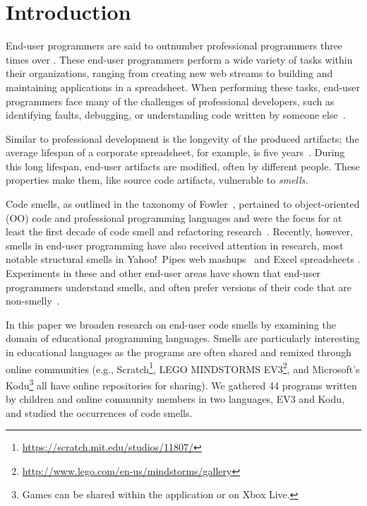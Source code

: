 \documentclass[conference]{IEEEtran}
\newcommand{\ms}{LEGO MINDSTORMS EV3}
\newcommand{\todo}[1]{\textbf{#1}}
\begin{document}
\section{Introduction}
End-user programmers are said to outnumber  professional programmers three times over \cite{Scaf2005}.
These end-user programmers perform a wide variety of tasks within their organizations, ranging from creating new web streams to building and maintaining applications in a spreadsheet. When performing these tasks, end-user programmers face many of the challenges of professional developers, such as identifying faults, debugging, or understanding code written by someone else~\cite{Ko2011}. 

Similar to professional development is the longevity of the produced artifacts; the average lifespan of a corporate spreadsheet, for example, is five years~\cite{Hermans2011}. During this long lifespan, end-user artifacts are modified, often by different people.
These properties make them, like source code artifacts, vulnerable to \emph{smells}. 

Code smells, as outlined in the taxonomy of Fowler~\cite{Fowl1999}, pertained to object-oriented (OO) code and professional programming languages and were the focus for at least the first decade of code smell  and refactoring research~\cite{Mens:2004:SSR:972215.972286}. Recently, however, smells in end-user programming have also received attention in research, most notable structural smells in Yahoo!\ Pipes web mashups~\cite{Stolee2011} and Excel spreadsheets \cite{Hermans2012inter}. Experiments in these and other end-user areas have shown that end-user programmers understand smells, and often prefer versions of their code that are non-smelly~\cite{Hermans2012intra, StoleeTSE2013, chambers2013smell}.


In this paper we broaden research on end-user code smells by examining the domain of educational programming languages. Smells are particularly interesting in educational languages as the programs are often shared and remixed through online communities (e.g., Scratch\footnote{\url{https://scratch.mit.edu/studios/11807/}}, \ms\footnote{\url{http://www.lego.com/en-us/mindstorms/gallery}}, and Microsoft's Kodu\footnote{Games can be shared within the application or on Xbox Live.} all have online repositories for sharing). We gathered 44 programs written by children and online community members in two languages, EV3 and  Kodu, and studied the occurrences of code smells.
\end{document}
